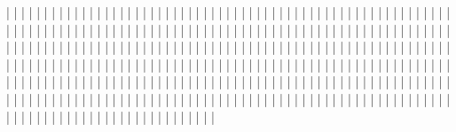    |
   |
   |
   |
   |
   |
   |
   |
   |
   |
   |
   |
   |
   |
   |
   |
   |
   |
   |
   |
   |
   |
   |
   |
   |
   |
   |
   |
   |
   |
   |
   |
   |
   |
   |
   |
   |
   |
   |
   |
   |
   |
   |
   |
   |
   |
   |
   |
   |
   |
   |
   |
   |
   |
   |
   |
   |
   |
   |
   |
   |
   |
   |
   |
   |
   |
   |
   |
   |
   |
   |
   |
   |
   |
   |
   |
   |
   |
   |
   |
   |
   |
   |
   |
   |
   |
   |
   |
   |
   |
   |
   |
   |
   |
   |
   |
   |
   |
   |
   |
   |
   |
   |
   |
   |
   |
   |
   |
   |
   |
   |
   |
   |
   |
   |
   |
   |
   |
   |
   |
   |
   |
   |
   |
   |
   |
   |
   |
   |
   |
   |
   |
   |
   |
   |
   |
   |
   |
   |
   |
   |
   |
   |
   |
   |
   |
   |
   |
   |
   |
   |
   |
   |
   |
   |
   |
   |
   |
   |
   |
   |
   |
   |
   |
   |
   |
   |
   |
   |
   |
   |
   |
   |
   |
   |
   |
   |
   |
   |
   |
   |
   |
   |
   |
   |
   |
   |
   |
   |
   |
   |
   |
   |
   |
   |
   |
   |
   |
   |
   |
   |
   |
   |
   |
   |
   |
   |
   |
   |
   |
   |
   |
   |
   |
   |
   |
   |
   |
   |
   |
   |
   |
   |
   |
   |
   |
   |
   |
   |
   |
   |
   |
   |
   |
   |
   |
   |
   |
   |
   |
   |
   |
   |
   |
   |
   |
   |
   |
   |
   |
   |
   |
   |
   |
   |
   |
   |
   |
   |
   |
   |
   |
   |
   |
   |
   |
   |
   |
   |
   |
   |
   |
   |
   |
   |
   |
   |
   |
   |
   |
   |
   |
   |
   |
   |
   |
   |
   |
   |
   |
   |
   |
   |
   |
   |
   |
   |
   |
   |
   |
   |
   |
   |
   |
   |
   |
   |
   |
   |
   |
   |
   |
   |
   |
   |
   |
   |
   |
   |
   |
   |
   |
   |
   |
   |
   |
   |
   |
   |
   |
   |
   |
   |
   |
   |
   |
   |
   |
   |
   |
   |
   |
   |
   |
   |
   |
   |
   |
   |
   |
   |
   |
   |
   |
   |
   |
   |
   |
   |
   |
   |
   |
   |
   |
   |
   |
   |
   |
   |
   |
   |
   |
   |
   |
   |
   |
   |
   |
   |
   |
   |
   |